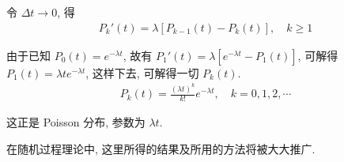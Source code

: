 \documentclass[../../main.tex]{subfiles}
\begin{document}
令 $\Delta t\to 0$, 得
\begin{align*}
P_k'(t)=\lambda\left[P_{k-1}(t)-P_k(t)\right],\quad k\geqslant 1
\end{align*}

由于已知 $P_0(t)=e^{-\lambda t}$, 故有 $P_1'(t)=\lambda\left[e^{-\lambda t}-P_1(t)\right]$, 可解得 $P_1(t)=\lambda t e^{-\lambda t}$, 这样下去, 可解得一切 $P_k(t)$.
\begin{align}
P_k(t)=\frac{(\lambda t)^k}{k!}e^{-\lambda t},\quad k=0,1,2,\cdots
\end{align}

这正是 Poisson 分布, 参数为 $\lambda t$.

在随机过程理论中, 这里所得的结果及所用的方法将被大大推广.
\end{document}
